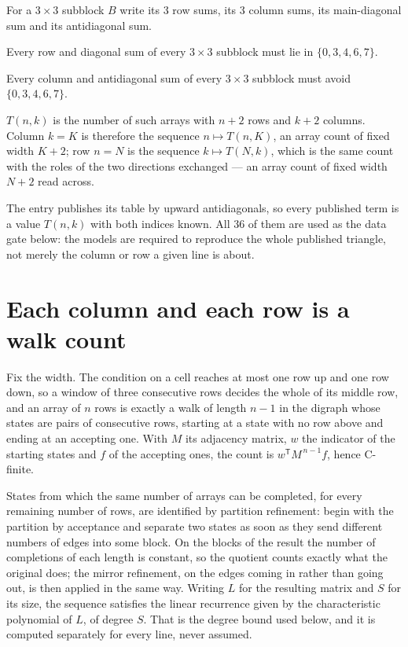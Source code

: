 \documentclass[11pt]{article}
\theoremstyle{definition}
\begin{document}
For a $3\times3$ subblock $B$ write its 3 row sums, its 3 column sums, its main-diagonal sum and its antidiagonal sum.

Every row and diagonal sum of every $3\times3$ subblock must lie in $\{0, 3, 4, 6, 7\}$.

Every column and antidiagonal sum of every $3\times3$ subblock must avoid $\{0, 3, 4, 6, 7\}$.

$T(n,k)$ is the number of such arrays with $n + 2$ rows and $k + 2$ columns. Column $k = K$ is therefore the sequence $n \mapsto T(n,K)$, an array count of fixed width $K + 2$; row $n = N$ is the sequence $k \mapsto T(N,k)$, which is the same count with the roles of the two directions exchanged --- an array count of fixed width $N + 2$ read across.

The entry publishes its table by upward antidiagonals, so every published term is a value $T(n,k)$ with both indices known. All 36 of them are used as the data gate below: the models are required to reproduce the whole published triangle, not merely the column or row a given line is about.

\section{Each column and each row is a walk count}

Fix the width. The condition on a cell reaches at most one row up and one row down, so a window of three consecutive rows decides the whole of its middle row, and an array of $n$ rows is exactly a walk of length $n-1$ in the digraph whose states are pairs of consecutive rows, starting at a state with no row above and ending at an accepting one. With $M$ its adjacency matrix, $w$ the indicator of the starting states and $f$ of the accepting ones, the count is $w^{\mathsf T}M^{\,n-1}f$, hence C-finite.

States from which the same number of arrays can be completed, for every remaining number of rows, are identified by partition refinement: begin with the partition by acceptance and separate two states as soon as they send different numbers of edges into some block. On the blocks of the result the number of completions of each length is constant, so the quotient counts exactly what the original does; the mirror refinement, on the edges coming in rather than going out, is then applied in the same way. Writing $L$ for the resulting matrix and $S$ for its size, the sequence satisfies the linear recurrence given by the characteristic polynomial of $L$, of degree $S$. That is the degree bound used below, and it is computed separately for every line, never assumed.
\end{document}
